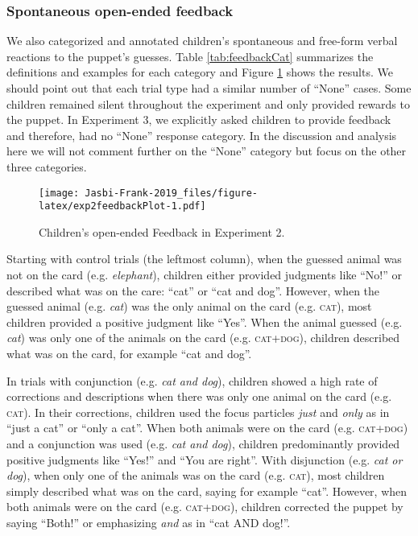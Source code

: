 \documentclass[,man,floatsintext]{apa6}
\begin{document}
\hypertarget{spontaneous-open-ended-feedback}{%
\subsubsection{Spontaneous open-ended feedback}\label{spontaneous-open-ended-feedback}}

We also categorized and annotated children's spontaneous and free-form verbal reactions to the puppet's guesses. Table \ref{tab:feedbackCat} summarizes the definitions and examples for each category and Figure \ref{fig:exp2feedbackPlot} shows the results. We should point out that each trial type had a similar number of \enquote{None} cases. Some children remained silent throughout the experiment and only provided rewards to the puppet. In Experiment 3, we explicitly asked children to provide feedback and therefore, had no \enquote{None} response category. In the discussion and analysis here we will not comment further on the \enquote{None} category but focus on the other three categories.

\begin{figure}
\centering
\texttt{[image: Jasbi-Frank-2019\_files/figure-latex/exp2feedbackPlot-1.pdf]}
\caption{\label{fig:exp2feedbackPlot}Children's open-ended Feedback in Experiment 2.}
\end{figure}

Starting with control trials (the leftmost column), when the guessed animal was not on the card (e.g. \emph{elephant}), children either provided judgments like \enquote{No!} or described what was on the care: \enquote{cat} or \enquote{cat and dog}. However, when the guessed animal (e.g. \emph{cat}) was the only animal on the card (e.g. \textsc{cat}), most children provided a positive judgment like \enquote{Yes}. When the animal guessed (e.g. \emph{cat}) was only one of the animals on the card (e.g. \textsc{cat+dog}), children described what was on the card, for example \enquote{cat and dog}.

In trials with conjunction (e.g. \emph{cat and dog}), children showed a high rate of corrections and descriptions when there was only one animal on the card (e.g. \textsc{cat}). In their corrections, children used the focus particles \emph{just} and \emph{only} as in \enquote{just a cat} or \enquote{only a cat}. When both animals were on the card (e.g. \textsc{cat+dog}) and a conjunction was used (e.g. \emph{cat and dog}), children predominantly provided positive judgments like \enquote{Yes!} and \enquote{You are right}. With disjunction (e.g. \emph{cat or dog}), when only one of the animals was on the card (e.g. \textsc{cat}), most children simply described what was on the card, saying for example \enquote{cat}. However, when both animals were on the card (e.g. \textsc{cat+dog}), children corrected the puppet by saying \enquote{Both!} or emphasizing \emph{and} as in \enquote{cat AND dog!}.
\end{document}

